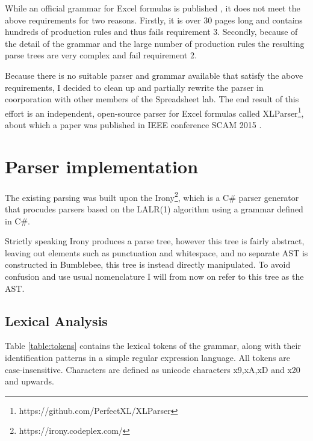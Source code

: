 While an official grammar for Excel formulas is published \cite{ExcelOfficialGrammar}, it does not meet the above requirements for two reasons.
Firstly, it is over 30 pages long and contains hundreds of production rules and thus fails requirement 3.
Secondly, because of the detail of the grammar and the large number of production rules the resulting parse trees are very complex and fail requirement 2.

Because there is no suitable parser and grammar available that satisfy the above requirements, I decided to clean up and partially rewrite the parser in coorporation with other members of the Spreadsheet lab.
The end result of this effort is an independent, open-source parser for Excel formulas called XLParser\footnote{https://github.com/PerfectXL/XLParser}, about which a paper was published in IEEE conference SCAM 2015 \cite{xlparser}.

\section{Parser implementation}

The existing parsing was built upon the Irony\footnote{https://irony.codeplex.com/}, which is a C\# parser generator that procudes parsers based on the LALR(1) algorithm using a grammar defined in C\#.

Strictly speaking Irony produces a parse tree, however this tree is fairly abstract, leaving out elements such as punctuation and whitespace, and no separate AST is constructed in Bumblebee, this tree is instead directly manipulated.
To avoid confusion and use usual nomenclature I will from now on refer to this tree as the AST.

\subsection{Lexical Analysis}
\label{sec:lexanalysis}

\begin{table}
\tiny
\caption{Lexical tokens used in the XLParser grammar, as refered to in section \ref{sec:lexanalysis}.}
\label{table:tokens}
\centerfloat

\end{table}

Table \ref{table:tokens} contains the lexical tokens of the grammar, along with their identification patterns in a simple regular expression language. All tokens are case-insensitive.
Characters are defined as unicode characters x9,xA,xD and x20 and upwards.

